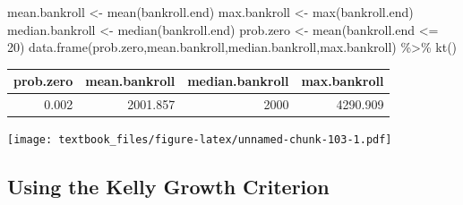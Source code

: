 \documentclass[
  11pt,
]{book}
\newenvironment{Shaded}{\begin{snugshade}}{\end{snugshade}}
\newcommand{\AttributeTok}[1]{\textcolor[rgb]{0.77,0.63,0.00}{#1}}
\newcommand{\DecValTok}[1]{\textcolor[rgb]{0.00,0.00,0.81}{#1}}
\newcommand{\FunctionTok}[1]{\textcolor[rgb]{0.00,0.00,0.00}{#1}}
\newcommand{\NormalTok}[1]{#1}
\newcommand{\OtherTok}[1]{\textcolor[rgb]{0.56,0.35,0.01}{#1}}
\newcommand{\SpecialCharTok}[1]{\textcolor[rgb]{0.00,0.00,0.00}{#1}}
\newcommand{\StringTok}[1]{\textcolor[rgb]{0.31,0.60,0.02}{#1}}
\theoremstyle{definition}
\theoremstyle{definition}
\theoremstyle{definition}
\theoremstyle{definition}
\theoremstyle{remark}
\begin{document}
\begin{Shaded}
\begin{Highlighting}[]
\NormalTok{mean.bankroll }\OtherTok{\textless{}{-}} \FunctionTok{mean}\NormalTok{(bankroll.end)}
\NormalTok{max.bankroll }\OtherTok{\textless{}{-}} \FunctionTok{max}\NormalTok{(bankroll.end)}
\NormalTok{median.bankroll }\OtherTok{\textless{}{-}} \FunctionTok{median}\NormalTok{(bankroll.end)}
\NormalTok{prob.zero }\OtherTok{\textless{}{-}} \FunctionTok{mean}\NormalTok{(bankroll.end }\SpecialCharTok{\textless{}=} \DecValTok{20}\NormalTok{)}
\FunctionTok{data.frame}\NormalTok{(prob.zero,mean.bankroll,median.bankroll,max.bankroll) }\SpecialCharTok{\%\textgreater{}\%} \FunctionTok{kt}\NormalTok{()}
\end{Highlighting}
\end{Shaded}

\begin{table}[H]
\centering
\begin{tabular}{rrrr}
\toprule
prob.zero & mean.bankroll & median.bankroll & max.bankroll\\
\midrule
0.002 & 2001.857 & 2000 & 4290.909\\
\bottomrule
\end{tabular}
\end{table}

\begin{Shaded}
\end{Shaded}

\texttt{[image: textbook\_files/figure-latex/unnamed-chunk-103-1.pdf]}

\newpage

\hypertarget{using-the-kelly-growth-criterion}{%
\subsection{Using the Kelly Growth Criterion}\label{using-the-kelly-growth-criterion}}
\end{document}
